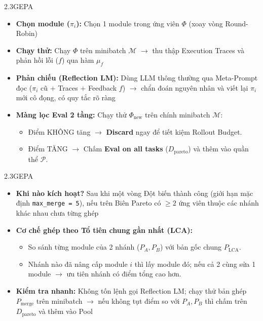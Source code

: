 \begin{frame}{2.3\quad GEPA}
  \begin{itemize}\setlength{\itemsep}{0.3em}
    \item \textbf{Chọn module ($\pi_i$):} Chọn 1 module trong ứng viên $\Phi$ (xoay vòng
          Round-Robin)
    \item \textbf{Chạy thử:} Chạy $\Phi$ trên minibatch $\mathcal{M}$ $\rightarrow$ thu thập
          Execution Traces và phản hồi lỗi ($f$) qua hàm $\mu_f$
    \item \textbf{Phản chiếu (Reflection LM):} Dùng LLM thông thường qua Meta-Prompt đọc
          ($\pi_i$ cũ $+$ Traces $+$ Feedback $f$) $\rightarrow$ chẩn đoán nguyên nhân và viết
          lại $\pi_i$ mới cô đọng, có quy tắc rõ ràng
    \item \textbf{Màng lọc Eval 2 tầng:} Chạy thử $\Phi_{\text{new}}$ trên chính minibatch
          $\mathcal{M}$:
      \begin{itemize}\tightlist
        \item Điểm KHÔNG tăng $\rightarrow$ \textbf{Discard} ngay để tiết kiệm Rollout Budget.
        \item Điểm TĂNG $\rightarrow$ Chấm \textbf{Eval on all tasks} ($D_{\text{pareto}}$)
              và thêm vào quần thể $\mathcal{P}$.
      \end{itemize}
  \end{itemize}
\end{frame}

\begin{frame}{2.3\quad GEPA}
  \begin{itemize}\setlength{\itemsep}{0.45em}
    \item \textbf{Khi nào kích hoạt?} Sau khi một vòng Đột biến thành công (giới hạn mặc định
          \texttt{max\_merge = 5}), nếu trên Biên Pareto có $\ge 2$ ứng viên thuộc các nhánh
          khác nhau chưa từng ghép
    \item \textbf{Cơ chế ghép theo Tổ tiên chung gần nhất (LCA):}
      \begin{itemize}\tightlist
        \item So sánh từng module của 2 nhánh ($P_A, P_B$) với bản gốc chung $P_{\text{LCA}}$.
        \item Nhánh nào đã nâng cấp module $i$ thì lấy module đó; nếu cả 2 cùng sửa 1 module
              $\rightarrow$ ưu tiên nhánh có điểm tổng cao hơn.
      \end{itemize}
    \item \textbf{Kiểm tra nhanh:} Không tốn lệnh gọi Reflection LM; chạy thử bản ghép
          $P_{\text{merge}}$ trên minibatch $\rightarrow$ nếu không tụt điểm so với $P_A, P_B$
          thì chấm trên $D_{\text{pareto}}$ và thêm vào Pool
  \end{itemize}
\end{frame}

